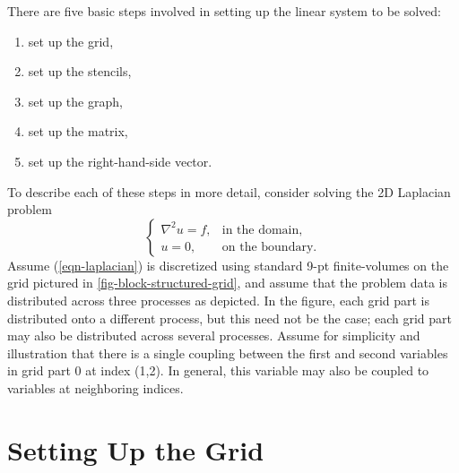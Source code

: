 There are five basic steps involved in setting up the linear system to
be solved:
\begin{enumerate}
\item set up the grid,
\item set up the stencils,
\item set up the graph,
\item set up the matrix,
\item set up the right-hand-side vector.
\end{enumerate}
To describe each of these steps in more detail, consider solving the
2D Laplacian problem
\begin{equation}\label{sstruct:eqn-laplacian}
\left \{
\begin{array}{ll}
\nabla^2 u = f , & \mbox{in the domain}, \\
u = 0,           & \mbox{on the boundary}.
\end{array}
\right .
\end{equation}
Assume (\ref{eqn-laplacian}) is discretized using standard 9-pt
finite-volumes on the grid pictured in
\ref{fig-block-structured-grid}, and assume that the problem data is
distributed across three processes as depicted.  In the figure, each
grid part is distributed onto a different process, but this need not
be the case; each grid part may also be distributed across several
processes.  Assume for simplicity and illustration that there is a
single coupling between the first and second variables in grid part 0
at index (1,2).  In general, this variable may also be coupled to
variables at neighboring indices.


\section{Setting Up the Grid}
\label{sstruct:Setting Up the Grid}

